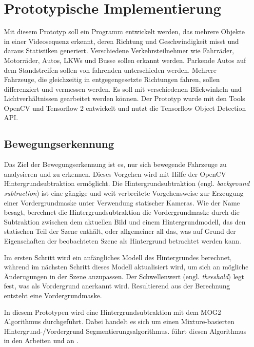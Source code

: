 
\chapter{Prototypische Implementierung}\label{sec:prototypical_implementation}

Mit diesem Prototyp soll ein Programm entwickelt werden, das mehrere Objekte in einer Videosequenz erkennt, deren Richtung und Geschwindigkeit misst und daraus Statistiken generiert. Verschiedene Verkehrsteilnehmer wie Fahrräder, Motorräder, Autos, LKWs und Busse sollen erkannt werden. Parkende Autos auf dem Standstreifen sollen von fahrenden unterschieden werden. Mehrere Fahrzeuge, die gleichzeitig in entgegengesetzte Richtungen fahren, sollen differenziert und vermessen werden. Es soll mit verschiedenen Blickwinkeln und Lichtverhältnissen gearbeitet werden können. Der Prototyp wurde mit den Tools OpenCV und Tensorflow 2 entwickelt und nutzt die Tensorflow Object Detection API.

\section{Bewegungserkennung}

Das Ziel der Bewegungserkennung ist es, nur sich bewegende Fahrzeuge zu analysieren und zu erkennen. Dieses Vorgehen wird mit Hilfe der OpenCV Hintergrundsubtraktion ermöglicht. Die Hintergrundsubtraktion (engl. \emph{background subtraction}) ist eine gängige und weit verbreitete Vorgehensweise zur Erzeugung einer Vordergrundmaske unter Verwendung statischer Kameras. Wie der Name besagt, berechnet die Hintergrundsubtraktion die Vordergrundmaske durch die Subtraktion zwischen dem aktuellen Bild und einem Hintergrundmodell, das den statischen Teil der Szene enthält, oder allgemeiner all das, was auf Grund der Eigenschaften der beobachteten Szene als Hintergrund betrachtet werden kann. 



Im ersten Schritt wird ein anfängliches Modell des Hintergrundes berechnet, während im nächsten Schritt dieses Modell aktualisiert wird, um sich an mögliche Änderugungen in der Szene anzupassen. Der Schwellenwert (engl. \emph{threshold}) legt fest, was als Vordergrund anerkannt wird. Resultierend aus der Berechnung entsteht eine Vordergrundmaske. 

In diesem Prototypen wird eine Hintergrundsubtraktion mit dem \ac{MOG}2 Algorithmus durchgeführt. Dabei handelt es sich um einen Mixture-basierten Hintergrund-/Vordergrund Segmentierungsalgorithmus. \citeauthor{ZIVKOVIC2006773} führt diesen Algorithmus in den Arbeiten  und  an \cites{1333992}{ZIVKOVIC2006773}. 

